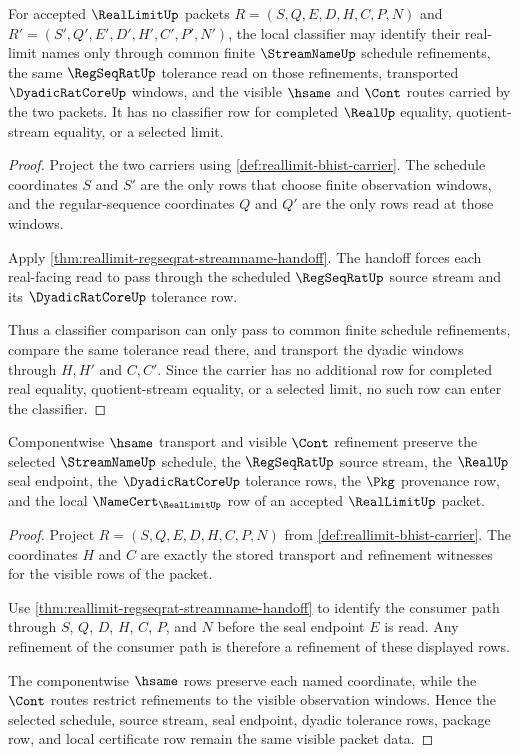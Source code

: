 \begin{theorem}
\label{thm:reallimit-classifier-obligation}
For accepted $\RealLimitUp$ packets
$R=(S,Q,E,D,H,C,P,N)$ and $R'=(S',Q',E',D',H',C',P',N')$, the local classifier
may identify their real-limit names only through common finite
$\StreamNameUp$ schedule refinements, the same $\RegSeqRatUp$ tolerance read on
those refinements, transported $\DyadicRatCoreUp$ windows, and the visible
$\hsame$ and $\Cont$ routes carried by the two packets. It has no classifier
row for completed $\RealUp$ equality, quotient-stream equality, or a selected
limit.
\end{theorem}
\begin{proof}
Project the two carriers using \autoref{def:reallimit-bhist-carrier}. The
schedule coordinates $S$ and $S'$ are the only rows that choose finite
observation windows, and the regular-sequence coordinates $Q$ and $Q'$ are the
only rows read at those windows.

Apply \autoref{thm:reallimit-regseqrat-streamname-handoff}. The handoff forces
each real-facing read to pass through the scheduled $\RegSeqRatUp$ source
stream and its $\DyadicRatCoreUp$ tolerance row.

Thus a classifier comparison can only pass to common finite schedule
refinements, compare the same tolerance read there, and transport the dyadic
windows through $H,H'$ and $C,C'$. Since the carrier has no additional row for
completed real equality, quotient-stream equality, or a selected limit, no such
row can enter the classifier.
\end{proof}

\begin{theorem}
\label{thm:reallimit-stability-obligation}
Componentwise $\hsame$ transport and visible $\Cont$ refinement preserve the
selected $\StreamNameUp$ schedule, the $\RegSeqRatUp$ source stream, the
$\RealUp$ seal endpoint, the $\DyadicRatCoreUp$ tolerance rows, the $\Pkg$
provenance row, and the local $\NameCert_{\RealLimitUp}$ row of an accepted
$\RealLimitUp$ packet.
\end{theorem}
\begin{proof}
Project $R=(S,Q,E,D,H,C,P,N)$ from
\autoref{def:reallimit-bhist-carrier}. The coordinates $H$ and $C$ are exactly
the stored transport and refinement witnesses for the visible rows of the
packet.

Use \autoref{thm:reallimit-regseqrat-streamname-handoff} to identify the
consumer path through $S$, $Q$, $D$, $H$, $C$, $P$, and $N$ before the seal
endpoint $E$ is read. Any refinement of the consumer path is therefore a
refinement of these displayed rows.

The componentwise $\hsame$ rows preserve each named coordinate, while the
$\Cont$ routes restrict refinements to the visible observation windows. Hence
the selected schedule, source stream, seal endpoint, dyadic tolerance rows,
package row, and local certificate row remain the same visible packet data.
\end{proof}

